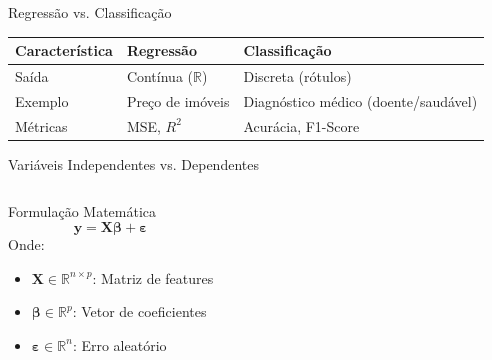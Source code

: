 \documentclass[]{beamer}
\begin{document}
\begin{frame}{Regressão vs. Classificação}
\vspace*{-1cm}
\footnotesize
  \begin{table}[h!]
    \centering
    \begin{tabular}{|l|l|l|}
      \hline
      \textbf{Característica} & \textbf{Regressão} & \textbf{Classificação} \\
      \hline
      Saída & Contínua (\( \mathbb{R} \)) & Discreta (rótulos) \\
      Exemplo & Preço de imóveis & Diagnóstico médico (doente/saudável) \\
      Métricas & MSE, \( R^2 \) & Acurácia, F1-Score \\
      \hline
    \end{tabular}
  \end{table}


\end{frame}

\begin{frame}{Variáveis Independentes vs. Dependentes}
  \begin{columns}
    \begin{block}{Formulação Matemática}
      \[
      \mathbf{y} = \mathbf{X}\boldsymbol{\beta} + \boldsymbol{\varepsilon}
      \]
      Onde:
      \begin{itemize}
        \item \( \mathbf{X} \in \mathbb{R}^{n \times p} \): Matriz de features
        \item \( \boldsymbol{\beta} \in \mathbb{R}^p \): Vetor de coeficientes
        \item \( \boldsymbol{\varepsilon} \in \mathbb{R}^n \): Erro aleatório
      \end{itemize}
    \end{block}

  \end{columns}
\end{frame}
\end{document}
